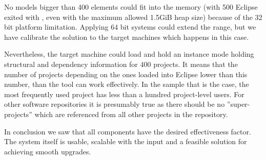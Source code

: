 No models bigger than 400 elements could fit into the memory (with 500 Eclipse
exited with , even with the maximum allowed 1.5GiB heap size)
because of the 32 bit platform limitation. Applying 64 bit systems could extend
the range, but we have calibrate the solution to the target machines which
happens in this case.

Nevertheless, the target machine could load and hold an instance mode holding
structural and dependency information for 400 projects. It means that the number
of projects depending on the ones loaded into Eclipse lower than this number,
than the tool can work effectively. In the sample that is the case, the most
frequently used project has less than a hundred project-level users. For other
 software repositories it is presumably true as there should be no
 ''super-projects'' which are referenced from all other projects in the
 repository.
 
In conclusion we saw that all components have the desired effectiveness factor.
The system itself is usable, scalable with the input and a feasible solution for
achieving smooth upgrades.
